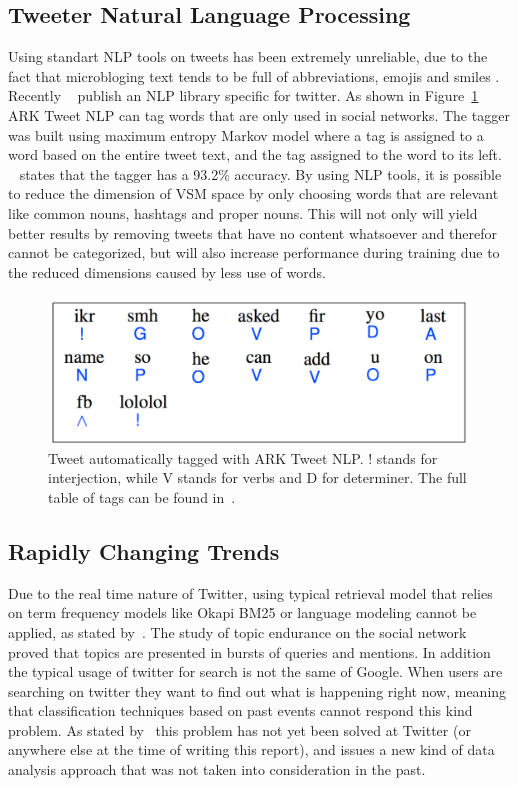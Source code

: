 \subsection{Tweeter Natural Language Processing}
\label{sub:tweeter_natural_language_processing}
Using standart \ac{NLP} tools on tweets has been extremely unreliable, due to the fact that microbloging text tends to be full of abbreviations, emojis and smiles . Recently ~\citet{owoputi13improvedparth} publish an \ac{NLP} library specific for twitter. As shown in Figure~\ref{fig:nlp} ARK Tweet \ac{NLP} can tag words that are only used in social networks. The tagger was built using maximum entropy Markov model where a tag is assigned to a word based on the entire tweet text, and the tag assigned to the word to its left. ~\citet{owoputi13improvedparth} states that the tagger has a 93.2\% accuracy. 
By using \ac{NLP} tools, it is possible to reduce the dimension of \ac{VSM} space by only choosing words that are relevant like common nouns, hashtags and proper nouns. This will not only will yield better results by removing tweets that have no content whatsoever and therefor cannot be categorized, but will also increase performance during training due to the reduced dimensions caused by less use of words.
\begin{figure}[htpb]
  \centering
  \includegraphics[width=0.6\linewidth]{./images/nlp.pdf}
  \caption{Tweet automatically tagged with ARK Tweet NLP. ! stands for interjection, while V stands for verbs and D for determiner. The full table of tags can be found in~\cite{owoputi13improvedparth}.}
  \label{fig:nlp}
\end{figure}

\subsection{Rapidly Changing Trends} 
\label{sub:real_time_}
Due to the real time nature of Twitter, using typical retrieval model that relies on term frequency models like Okapi BM25 or language modeling cannot be applied, as stated by~\citet{Lin2012}. The study of topic endurance on the social network proved that topics are presented in bursts of queries and mentions. In addition the typical usage of twitter for search is not the same of Google. When users are searching on twitter they want to find out what is happening right now, meaning that classification techniques based on past events cannot respond this kind problem. As stated by~\citet{Lin2012} this problem has not yet been solved at Twitter (or anywhere else at the time of writing this report), and issues a new kind of data analysis approach that was not taken into consideration in the past. 

